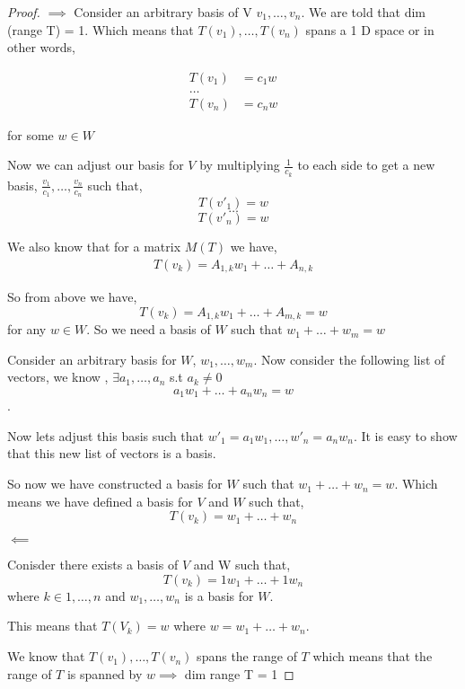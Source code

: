 \documentclass[a4paper]{report}
\begin{document}
\begin{proof}
    $\implies$
    Consider an arbitrary basis of V $v_1,\dots,v_n$. We are told that dim (range T) = 1. Which means that $T(v_1),\dots,T(v_n)$ spans a 1 D space or in other words,

    \begin{align*}
        T(v_1) &= c_1w\\
        \dots\\
        T(v_n) &= c_nw
    \end{align*}

    for some $w \in W$

    Now we can adjust our basis for $V$ by multiplying $\frac{1}{c_k}$ to each side to get a new basis, $\frac{v_1}{c_1}, \dots, \frac{v_n}{c_n}$ such that, 
    $$ T(v'_1) = w $$ 
    $$ \dots $$ 
    $$ T(v'_n) = w $$ 


    We also know that for a matrix $M(T)$ we have, 
    \begin{align*}
        T(v_k) = A_{1,k}w_1+ \dots + A_{n,k}
    \end{align*}

    So from above we have, 
        $$T(v_k) = A_{1,k}w_1+ \dots + A_{m,k} = w$$ for any $w \in W$. So we need a basis of $W$ such that $w_1+ \dots + w_m = w$

    Consider an arbitrary basis for $W$, $w_1,\dots,w_m$. Now consider the  following list of vectors, we know , $\exists a_1,\dots,a_n$ s.t $a_k \ne 0$
    $$ a_1w_1 + \dots + a_nw_n = w $$.

    Now lets adjust this basis such that $w'_1 = a_1w_1,\dots,w'_n = a_nw_n$. It is easy to show that this new list of vectors is a basis.

    So now we have constructed a basis for $W$ such that $w_1+ \dots + w_n = w$. Which means we have defined a basis for $V$ and $W$ such that, 
    $$ T(v_k) = w_1 + \dots + w_n $$ 




     $\impliedby$

     Conisder there exists a basis of $V$ and W such that, 
     $$ T(v_k) = 1w_1+ \dots + 1w_n $$  where $k \in {1,\dots,n}$ and $w_1,\dots,w_n$ is a basis for $W$.

     This means that  $T(V_k) = w$ where $w = w_1+ \dots + w_n$.

     We know that $T(v_1),\dots,T(v_n)$ spans the range of $T$ which means that the range of $T$ is spanned by $w \implies$ dim range T = 1
\end{proof}
\end{document}

